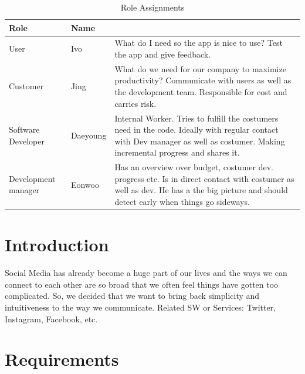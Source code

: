 \documentclass[conference]{IEEEtran}
\numberwithin{figure}{subsection}
\begin{document}
\begin{table}[ht!] \renewcommand\arraystretch{1.25}
  \begin{threeparttable}
      \caption{Role Assignments%
      \label{tab:table1}}    %
      \begin{tabular}{@{}l l>{\raggedright\arraybackslash}p{3.8cm}@{}}
      \toprule
      \bfseries Role & \bfseries Name & \multicolumn{1}{l}{\bfseries Task description and etc.} \\
      \midrule
      User & Ivo & What do I need so the app is nice to use? Test the app and give feedback.\\
      
      Customer & Jing & What do we need for our company to maximize productivity? Communicate with users as well as the development team. Responsible for cost and carries risk.\\
      
      Software Developer & Daeyoung & Internal Worker. Tries to fulfill the costumers need in the code. Ideally with regular contact with Dev manager as well as costumer. Making incremental progress and shares it.\\
      
      Development manager & Eonwoo & Has an overview over budget, costumer dev. progress etc. Is in direct contact with costumer as well as dev. He has a the big picture and should detect early when things go sideways.\\
      \bottomrule
      \end{tabular}
  \end{threeparttable}
\end{table}



\section{Introduction} 
Social Media has already become a huge part of our lives and the ways we can connect to each other are so broad that we often feel things have gotten too complicated. So, we decided that we want to bring back simplicity and intuitiveness to the way we communicate. Related SW or Services: Twitter, Instagram, Facebook, etc. 
\newline

\section{Requirements}
\end{document}
